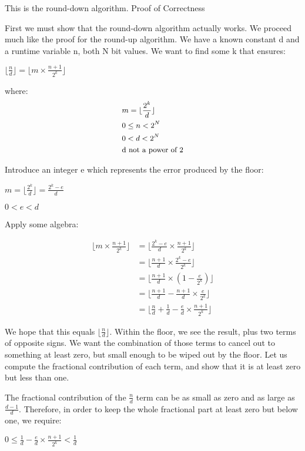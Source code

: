 This is the round-down algorithm.
Proof of Correctness

First we must show that the round-down algorithm actually works. We proceed much like the proof for the round-up algorithm. We have a known constant d and a runtime variable n, both N bit values. We want to find some k that ensures:

$\lfloor \frac n d \rfloor = \lfloor m \times \frac {n+1} {2^k} \rfloor$

where: $$ \small \begin{align} \small & m = \lfloor \frac {2^k} d \rfloor \\ & 0 \le n < 2^{N} \\ & 0 < d < 2^{N} \\ & \text{d not a power of 2} \end{align} $$

Introduce an integer e which represents the error produced by the floor:

$ m = \lfloor \frac {2^k} d \rfloor = \frac {2^k - e} d $

$0 < e < d$

Apply some algebra:

$$\begin{align} \lfloor m \times \frac {n+1} {2^k} \rfloor & = \lfloor \frac {2^k - e} d \times \frac {n + 1} {2^k} \rfloor \\ & = \lfloor \frac {n + 1} d \times \frac {2^k - e} {2^k} \rfloor \\ & = \lfloor \frac {n + 1} d \times ( 1 - \frac e {2^k} ) \rfloor \\ & = \lfloor \frac {n+1} d - \frac {n+1} d \times \frac e {2^k} \rfloor \\ & = \lfloor \frac n d + \frac 1 d - \frac e d \times \frac {n+1} {2^k} \rfloor \end{align} $$

We hope that this equals $\lfloor \frac n d \rfloor$. Within the floor, we see the result, plus two terms of opposite signs. We want the combination of those terms to cancel out to something at least zero, but small enough to be wiped out by the floor. Let us compute the fractional contribution of each term, and show that it is at least zero but less than one.

The fractional contribution of the $\frac n d$ term can be as small as zero and as large as $\frac {d-1} d$. Therefore, in order to keep the whole fractional part at least zero but below one, we require:

$ 0 \le \frac 1 d - \frac e d \times \frac {n+1} {2^k} < \frac 1 d$

